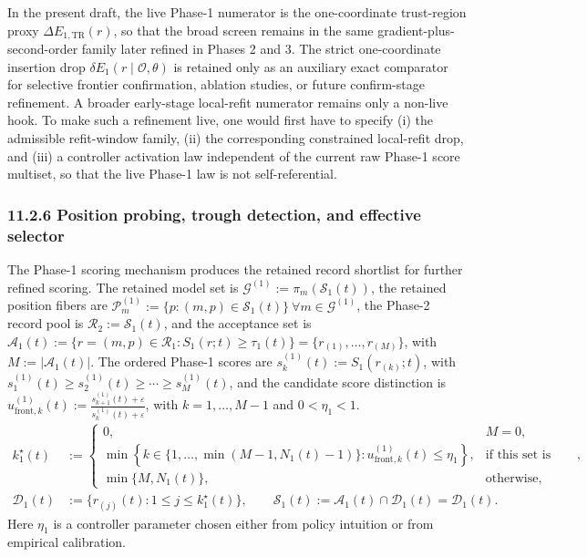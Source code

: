 \documentclass[11pt]{article}
\begin{document}
In the present draft, the live Phase-1 numerator is the one-coordinate trust-region proxy \(\Delta E_{1,\mathrm{TR}}(r)\), so that the broad screen remains in the same gradient-plus-second-order family later refined in Phases 2 and 3. The strict one-coordinate insertion drop \(\delta E_1(r\mid\mathcal O,\theta)\) is retained only as an auxiliary exact comparator for selective frontier confirmation, ablation studies, or future confirm-stage refinement. A broader early-stage local-refit numerator remains only a non-live hook. To make such a refinement live, one would first have to specify (i) the admissible refit-window family, (ii) the corresponding constrained local-refit drop, and (iii) a controller activation law independent of the current raw Phase-1 score multiset, so that the live Phase-1 law is not self-referential.

\subsubsection*{11.2.6 Position probing, trough detection, and effective selector}
The Phase-1 scoring mechanism produces the retained record shortlist for further refined scoring. The retained model set is \(\mathcal G^{(1)}:=\pi_m(\mathcal S_1(t))\), the retained position fibers are \(\mathcal P_m^{(1)}:=\{p:(m,p)\in\mathcal S_1(t)\}\ \forall m\in\mathcal G^{(1)}\), the Phase-2 record pool is \(\mathcal R_2:=\mathcal S_1(t)\), and the acceptance set is \(\mathcal A_1(t):=\{r=(m,p)\in\mathcal R_1:S_1(r;t)\ge \tau_1(t)\}=\{r_{(1)},\dots,r_{(M)}\}\), with \(M:=|\mathcal A_1(t)|\). The ordered Phase-1 scores are \(s_k^{(1)}(t):=S_1(r_{(k)};t)\), with \(s^{(1)}_1(t)\ge s^{(1)}_2(t)\ge\cdots\ge s^{(1)}_M(t)\), and the candidate score distinction is \(u_{\mathrm{front},k}^{(1)}(t):=\frac{s^{(1)}_{k+1}(t)+\varepsilon}{s^{(1)}_{k}(t)+\varepsilon}\), with \(k=1,\dots,M-1\) and \(0<\eta_1<1\).
\[
\begin{aligned}
k_1^\star(t)&:=
\begin{cases}
0, & M=0,\\[4pt]
\min\!\left\{k\in\{1,\dots,\min(M-1,N_1(t)-1)\}:u_{\mathrm{front},k}^{(1)}(t)\le \eta_1\right\},
& \text{if this set is nonempty},\\[6pt]
\min\{M,N_1(t)\}, & \text{otherwise},
\end{cases}\\
\mathcal D_1(t)&:=\{r_{(j)}(t):1\le j\le k_1^\star(t)\},
\qquad
\mathcal S_1(t):=\mathcal A_1(t)\cap \mathcal D_1(t)=\mathcal D_1(t).
\end{aligned}
\]
Here \(\eta_1\) is a controller parameter chosen either from policy intuition or from empirical calibration.
\end{document}
